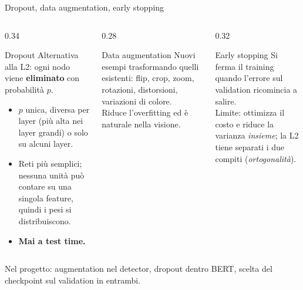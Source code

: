 \documentclass[aspectratio=169]{beamer}
\begin{document}
\begin{frame}{Dropout, data augmentation, early stopping}
  \small
  \begin{columns}[T]
    \begin{column}{0.34\textwidth}
      \begin{block}{Dropout}
        Alternativa alla L2: ogni nodo viene \textbf{eliminato} con
        probabilità $p$.
        \begin{itemize}
          \item $p$ unica, diversa per layer (più alta nei layer grandi) o solo
                su alcuni layer.
          \item Reti più semplici; nessuna unità può contare su una singola
                feature, quindi i pesi si distribuiscono.
          \item \textbf{Mai a test time.}
        \end{itemize}
      \end{block}
    \end{column}
    \begin{column}{0.28\textwidth}
      \begin{block}{Data augmentation}
        Nuovi esempi trasformando quelli esistenti: flip, crop, zoom,
        rotazioni, distorsioni, variazioni di colore.
        \\[4pt]
        Riduce l'overfitting ed è naturale nella visione.
      \end{block}
    \end{column}
    \begin{column}{0.32\textwidth}
      \begin{block}{Early stopping}
        Si ferma il training quando l'errore sul validation ricomincia a
        salire.
        \\[4pt]
        Limite: ottimizza il costo e riduce la varianza \emph{insieme}; la L2
        tiene separati i due compiti (\emph{ortogonalità}).
      \end{block}
    \end{column}
  \end{columns}
  \vspace{0.05cm}
  \begin{center}
    \footnotesize Nel progetto: augmentation nel detector, dropout dentro
    BERT, scelta del checkpoint sul validation in entrambi.
  \end{center}
\end{frame}
\end{document}
